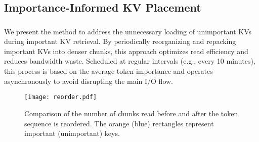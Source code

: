 \subsection{Importance-Informed KV Placement}
\label{sec:techb}

\subsubsection{\techBa{}}
\label{sec:techba}


We present the \techba{} method to address the unnecessary loading of unimportant KVs during important KV retrieval. By periodically reorganizing and repacking important KVs into denser chunks, this approach optimizes read efficiency and reduces bandwidth waste.
Scheduled at regular intervals (e.g., every 10 minutes), this process is based on the average token importance and operates asynchronously to avoid disrupting the main I/O flow.


\begin{figure}
	\centering
	\texttt{[image: reorder.pdf]}
	\caption{Comparison of the number of chunks read before and after the token sequence is reordered. The orange (blue) rectangles represent important (unimportant) keys.}
	\label{fig:reordering}
	\vspace{-0.1in}
\end{figure}

